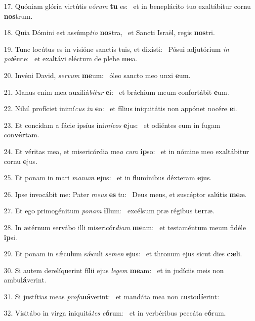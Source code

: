 17. Quóniam glória virtútis e\textit{ó}\textit{rum} \textbf{tu} es: \ast\  et in beneplácito tuo exaltábitur cornu \textbf{nos}trum.\

18. Quia Dómini est assúmp\textit{ti}\textit{o} \textbf{nos}tra, \ast\  et Sancti Israël, regis \textbf{nos}tri.\

19. Tunc locútus es in visióne sanctis tuis, et dixísti: \dag\  Pósui adjutórium \textit{in} \textit{pot}\textbf{én}te: \ast\  et exaltávi eléctum de plebe \textbf{me}a.\

20. Invéni David, \textit{ser}\textit{vum} \textbf{me}um: \ast\  óleo sancto meo unxi \textbf{e}um.\

21. Manus enim mea auxiliá\textit{bi}\textit{tur} \textbf{e}i: \ast\  et bráchium meum confortábit \textbf{e}um.\

22. Nihil profíciet inimí\textit{cus} \textit{in} \textbf{e}o: \ast\  et fílius iniquitátis non appónet nocére \textbf{e}i.\

23. Et concídam a fácie ipsíus ini\textit{mí}\textit{cos} \textbf{e}jus: \ast\  et odiéntes eum in fugam con\textbf{vér}tam.\

24. Et véritas mea, et misericórdia me\textit{a} \textit{cum} \textbf{ip}so: \ast\  et in nómine meo exaltábitur cornu \textbf{e}jus.\

25. Et ponam in mari \textit{ma}\textit{num} \textbf{e}jus: \ast\  et in flumínibus déxteram \textbf{e}jus.\

26. Ipse invocábit me: Pater \textit{me}\textit{us} \textbf{es} tu: \ast\  Deus meus, et suscéptor salútis \textbf{me}æ.\

27. Et ego primogénitum \textit{po}\textit{nam} \textbf{il}lum: \ast\  excélsum præ régibus \textbf{ter}ræ.\

28. In ætérnum servábo illi misericór\textit{di}\textit{am} \textbf{me}am: \ast\  et testaméntum meum fidéle \textbf{ip}si.\

29. Et ponam in sǽculum sǽculi \textit{se}\textit{men} \textbf{e}jus: \ast\  et thronum ejus sicut dies \textbf{cæ}li.\

30. Si autem derelíquerint fílii ejus \textit{le}\textit{gem} \textbf{me}am: \ast\  et in judíciis meis non ambu\textbf{lá}verint.\

31. Si justítias meas \textit{pro}\textit{fa}\textbf{ná}verint: \ast\  et mandáta mea non custo\textbf{dí}erint:\

32. Visitábo in virga iniquitá\textit{tes} \textit{e}\textbf{ó}rum: \ast\  et in verbéribus peccáta e\textbf{ó}rum.\

